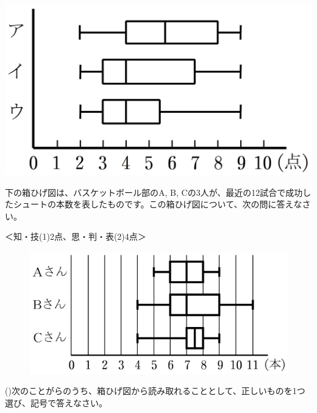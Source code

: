 \documentclass[
  12pt,a4paper,lualatex,ja=standard]{bxjsarticle}
\begin{document}
\begin{flushleft}
\begin{multicols}{3}
\columnbreak

\def\@captype{figure}
\includegraphics{img/image2.png}


\end{multicols}

\vfill

\newpage

\setcounter{skaunta}{0}

\noindent{} \hspace{1pt}下の箱ひげ図は、バスケットボール部のA, B, Cの3人が、最近の12試合で成功したシュートの本数を表したものです。この箱ひげ図について、次の問に答えなさい。

%
\begin{flushright}%
\footnotesize{＜知・技(1)2点、思・判・表(2)4点＞}%
\end{flushright}%


\begin{figure}
\centering
\includegraphics{img/image4.png}
\end{figure}

()\hspace{2.5pt}次のことがらのうち、箱ひげ図から読み取れることとして、正しいものを1つ選び、記号で答えなさい。


\end{flushleft}
\end{document}
